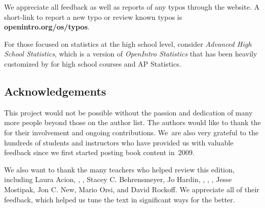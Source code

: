\noindent%
We appreciate all feedback as well as reports of any
typos through the website.
A short-link to report a new typo or review known typos is
    {\color{black}\textbf{openintro.org/os/typos}}. \vspace{3mm}

\noindent%
For those focused on statistics at the high school level,
consider
    {\emph{Advanced High School Statistics}},
which is a version of \emph{OpenIntro Statistics} that has
been heavily customized by 
for high school courses and
AP\textsuperscript{\textregistered} Statistics.


\subsection*{Acknowledgements}
This project would not be possible without the passion and
dedication of many more people beyond those on the author list.
The authors would like to thank the
for their involvement and ongoing contributions.
We~are also very grateful to the hundreds of students
and instructors who have provided us with valuable feedback
since we first started posting book content in~2009. \vspace{3mm}

\noindent%
We also want to thank the many teachers who helped review
this edition, including
Laura Acion,
,
,
Stacey C. Behrensmeyer,
Jo Hardin,
,
,
,
Jesse Mostipak,
Jon C. New,
Mario Orsi,
and David Rockoff.
We appreciate all of their feedback, which helped
us tune the text in significant ways for the better.
